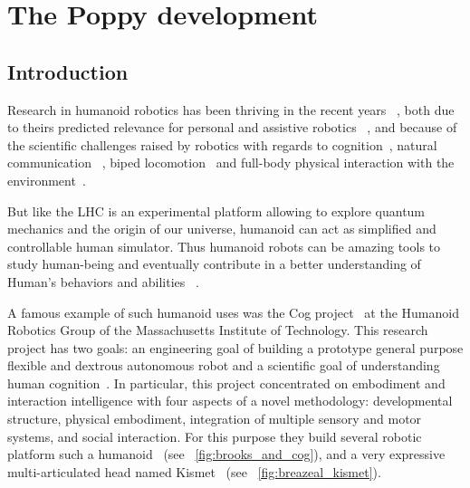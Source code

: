 
\cleartoleftpage




\chapter{The Poppy development} %


\section{Introduction} %

Research in humanoid robotics has been thriving in the recent years~\cite{hirai1998development} \cite{kaneko2008humanoid}, both due to theirs predicted relevance for personal and assistive robotics~\cite{tapus2007socially} \cite{oztop2005human}, and because of the scientific challenges raised by robotics with regards to cognition~\cite{asada2001cognitive}, natural communication~\cite{stiefelhagen2004natural} \cite{breazeal2002robots}, biped locomotion~\cite{yamaguchi1999development} \cite{chestnutt2005footstep} \cite{collins2005bipedal} and full-body physical interaction with the environment~\cite{ude2004programming}.

But like the LHC is an experimental platform allowing to explore quantum mechanics and the origin of our universe,  humanoid can act as simplified and controllable human simulator. Thus humanoid robots can be amazing tools to study human-being and eventually contribute in a better understanding of Human's behaviors and abilities~\cite{atkeson2000using} \cite{cheng2007cb} \cite{brooks1986achieving}.

A famous example of such humanoid uses was the Cog project~\cite{brooks1999cog} at the Humanoid Robotics Group of the Massachusetts Institute of Technology. This research project has two goals: an engineering goal of building a prototype general purpose flexible and dextrous autonomous robot and a scientific goal of understanding human cognition~\cite{brooks1994building}. In particular, this project concentrated on embodiment and interaction intelligence with four aspects of a novel methodology: developmental structure, physical embodiment, integration of multiple sensory and motor systems, and social interaction. For this purpose they build several robotic platform such a humanoid~\cite{brooks1999cog} (see \figurename~\ref{fig:brooks_and_cog}), and a very expressive multi-articulated head named Kismet~\cite{breazeal2003emotion} (see \figurename~\ref{fig:breazeal_kismet}).

